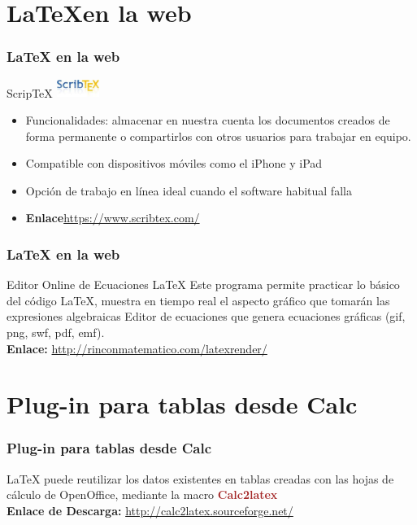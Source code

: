 \documentclass[sans serif,9pt,xcolor=dvipsnames]{beamer}%
\begin{document}
\section{\LaTeX en la web}
\begin{frame}
\frametitle {\LaTeX \hspace{0.1cm}  en la web}
\begin{block}{ScripTeX}
\hfill \includegraphics[width=1.4cm]{imagenes/scribtex.jpg} 
\begin{itemize}
\justifying
\item Funcionalidades: almacenar en nuestra cuenta los documentos creados de forma permanente o compartirlos con otros usuarios para trabajar en equipo.
\item Compatible con dispositivos móviles como el iPhone y iPad
\item Opción de trabajo en línea ideal cuando el software habitual falla
\item \textbf{Enlace}\textcolor{blue}{\url{https://www.scribtex.com/}}
\end{itemize}
\end{block}
\end{frame}

\begin{frame}
\frametitle {\LaTeX \hspace{0.2cm} en la web}

\begin{block}{Editor Online de Ecuaciones \LaTeX}
\justifying
Este programa permite practicar lo básico del código LaTeX, muestra en tiempo real el aspecto gráfico que tomarán las expresiones algebraicas
Editor de ecuaciones que genera ecuaciones gráficas (gif, png, swf, pdf, emf).\\
\textbf{Enlace: }\textcolor{blue}{\url{http://rinconmatematico.com/latexrender/}}
\end{block}

\end{frame}

\section{Plug-in para tablas desde Calc}
\begin{frame}
\frametitle {Plug-in para tablas desde Calc}
\justifying
LaTeX puede reutilizar los datos existentes en tablas creadas con las hojas de cálculo de OpenOffice, mediante la macro \textcolor{brown}{\textbf{ Calc2latex}}\\

\textbf{Enlace de Descarga: }\textcolor{blue}{\url{http://calc2latex.sourceforge.net/}}
\end{frame}
\end{document}
